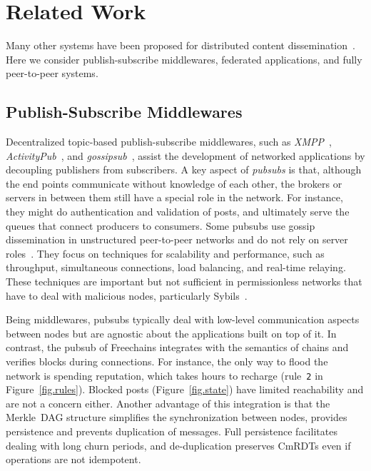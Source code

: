 \documentclass[10pt,journal,compsoc]{IEEEtran}
\newcommand{\FC}       {Freechains\xspace}
\begin{document}
\section{Related Work}
\label{sec.related}


Many other systems have been proposed for distributed content
dissemination~\cite{p2p.ecosystem}.
Here we consider publish-subscribe middlewares, federated applications, and
fully peer-to-peer systems.

\subsection{Publish-Subscribe Middlewares}

Decentralized topic-based publish-subscribe middlewares, such as
    \emph{XMPP}~\cite{pubsub.xmpp},
    \emph{ActivityPub}~\cite{pubsub.activitypub}, and
    \emph{gossipsub}~\cite{pubsub.gossipsub},
assist the development of networked applications by decoupling publishers from
subscribers.
%
A key aspect of \emph{pubsubs} is that, although the end points communicate
without knowledge of each other, the brokers or servers in between them still
have a special role in the network.
For instance, they might do authentication and validation of posts, and
ultimately serve the queues that connect producers to consumers.
%
Some pubsubs use gossip dissemination in unstructured peer-to-peer networks and
do not rely on server
roles~\cite{pubsub.tera,pubsub.rappel,pubsub.stan,pubsub.vitis,pubsub.gossipsub,pubsub.rappel}.
They focus on techniques for scalability and performance, such as throughput,
simultaneous connections, load balancing, and real-time relaying.
These techniques are important but not sufficient in permissionless networks
that have to deal with malicious nodes, particularly
Sybils~\cite{pubsub.gossipsub2}.

Being middlewares, pubsubs typically deal with low-level communication aspects
between nodes but are agnostic about the applications built on top of it.
In contrast, the pubsub of \FC integrates with the semantics of chains and
verifies blocks during connections.
For instance, the only way to flood the network is spending reputation, which
takes hours to recharge (rule~\texttt{2} in Figure~\ref{fig.rules}).
Blocked posts (Figure~\ref{fig.state}) have limited reachability and are not a
concern either.
Another advantage of this integration is that the Merkle~DAG structure
simplifies the synchronization between nodes, provides persistence and prevents
duplication of messages.
Full persistence facilitates dealing with long churn periods, and
de-duplication preserves CmRDTs even if operations are not idempotent.
\end{document}
